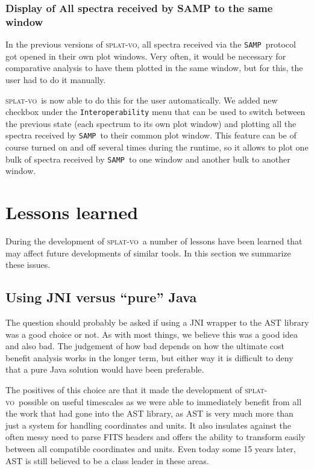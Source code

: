\documentclass[final,authoryear,5p,times,twocolumn]{elsarticle}
\newcommand{\samp}{\texttt{SAMP}}
\newcommand{\splatvo}{\textsc{splat-vo}}
\begin{document}
\subsubsection{Display of All  spectra received by SAMP to the same  window}

In the previous versions of \splatvo, all spectra received via the \samp\
protocol got opened in their own plot windows. Very often, it would be
necessary for comparative analysis to have them plotted in the same
window, but for this, the user had to do it manually.

\splatvo\ is now able to do this
for the user automatically. We added new checkbox under the
\texttt{Interoperability} menu that can be used to switch between the previous
state (each spectrum to its own plot window) and plotting all the
spectra received by \samp\ to their common plot window. This feature
can be of course turned on and off several times during the runtime,
so it allows to plot one bulk of spectra received by \samp\ to one
window and another bulk to another window.

\section{Lessons learned}

During the development of \splatvo\ a number of lessons have been
learned that may affect future developments of similar tools. In this
section we summarize these issues.

\subsection{Using JNI versus ``pure'' Java}
\label{sec:jniast-lesson}

The question should probably be asked if using a JNI wrapper to the
AST library was a good choice or not. As with most things, we believe
this was a good idea and also bad. The judgement of how bad depends on
how the ultimate cost benefit analysis works in the longer term, but
either way it is difficult to deny that a pure Java solution would
have been preferable.

The positives of this choice are that it made the development of
\splatvo\ possible on useful timescales as we were able to immediately
benefit from all the work that had gone into the AST library, as AST
is very much more than just a system for handling coordinates and
units. It also insulates against the often messy need to parse FITS
headers and offers the ability to transform easily between all
compatible coordinates and units. Even today some 15 years later, AST
is still believed to be a class leader in these areas.
\end{document}
